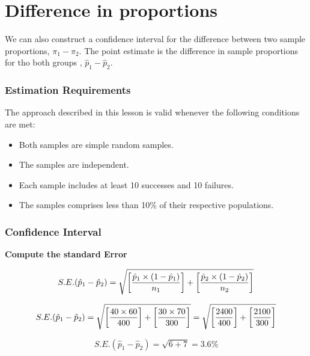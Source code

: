 \documentclass[]{report}
\begin{document}



\section{Difference in proportions}
We can also construct a confidence interval for the difference between two sample proportions, $\pi_1 - \pi_2$. The point estimate is the difference in sample proportions for tho both groups , $\hat{p}_1- \hat{p}_2$.\\\bigskip


\subsubsection{Estimation Requirements}
The approach described in this lesson is valid whenever the following conditions are met:

\begin{itemize}
\item Both samples are simple random samples.
\item The samples are independent.
\item Each sample includes at least 10 successes and 10 failures.
\item The samples comprises less than 10\% of their respective populations.
\end{itemize}




\subsubsection{Confidence Interval}
\textbf{Compute the standard Error}

\[ S.E. (\hat{p}_1 - \hat{p}_2) =
\sqrt{ \left[{\hat{p}_1 \times (1 - \hat{p}_1) \over n_1}\right] + \left[{\hat{p}_2 \times (1 - \hat{p}_2) \over n_2}\right] } \]

\[ S.E. (\hat{p}_1 - \hat{p}_2) =
\sqrt{ \left[{40 \times 60 \over 400}\right] + \left[{30 \times 70 \over 300}\right] }  = \sqrt{ \left[{2400 \over 400}\right] + \left[{2100\over 300}\right] } \]

\[ S.E. (\hat{p}_1 - \hat{p}_2)
= \sqrt{ 6 + 7 } = 3.6\% \]
\end{document}

